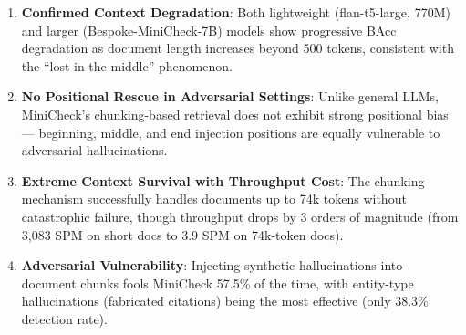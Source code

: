 \documentclass[12pt, letterpaper]{article}
\begin{document}
\begin{enumerate}
    \item \textbf{Confirmed Context Degradation}: Both lightweight (flan-t5-large, 770M) and larger (Bespoke-MiniCheck-7B) models show progressive BAcc degradation as document length increases beyond 500 tokens, consistent with the ``lost in the middle'' phenomenon.

    \item \textbf{No Positional Rescue in Adversarial Settings}: Unlike general LLMs, MiniCheck's chunking-based retrieval does not exhibit strong positional bias — beginning, middle, and end injection positions are equally vulnerable to adversarial hallucinations.

    \item \textbf{Extreme Context Survival with Throughput Cost}: The chunking mechanism successfully handles documents up to 74k tokens without catastrophic failure, though throughput drops by 3 orders of magnitude (from 3,083 SPM on short docs to 3.9 SPM on 74k-token docs).

    \item \textbf{Adversarial Vulnerability}: Injecting synthetic hallucinations into document chunks fools MiniCheck 57.5\% of the time, with entity-type hallucinations (fabricated citations) being the most effective (only 38.3\% detection rate).
\end{enumerate}



\end{document}
